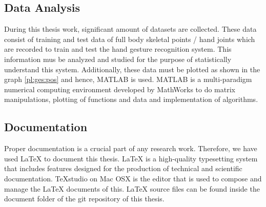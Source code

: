\subsection{Data Analysis} During this thesis work, significant amount of datasets are collected. These data consist of training and test data of full body skeletal points / hand joints which are recorded to train and test the hand gesture recognition system. This information mus be analyzed and studied for the purpose of statistically understand this system. Additionally, these data must be plotted as shown in the graph \ref{pl:ges:pos} and hence, MATLAB is used. MATLAB is a multi-paradigm numerical computing environment developed by MathWorks to do matrix manipulations, plotting of functions and data and implementation of algorithms. 

\subsection{Documentation} Proper documentation is a crucial part of any research work. Therefore, we have used LaTeX to document this thesis. LaTeX is a high-quality typesetting system that includes features designed for the production of technical and scientific documentation. TeXstudio on Mac OSX is the editor that is used to compose and manage the LaTeX documents of this. LaTeX source files can be found inside the document folder of the git repository of this thesis.
